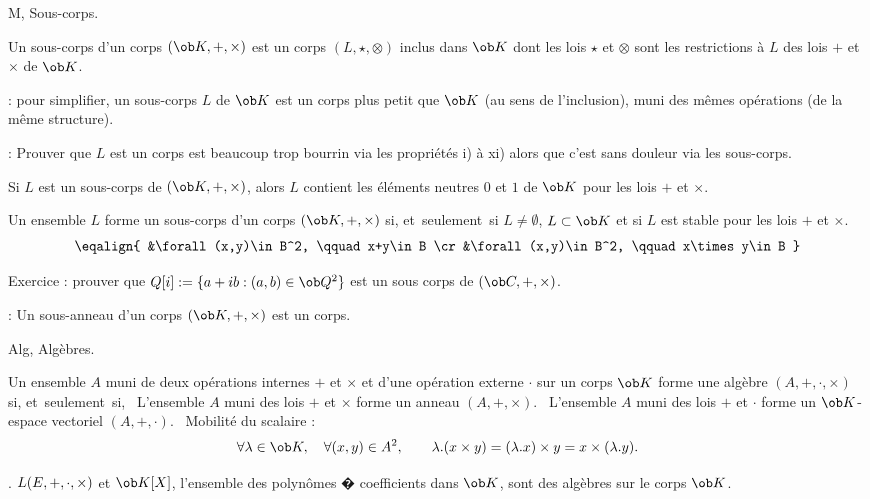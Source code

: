                                                                                                   
\Subsection M, Sous-corps. 


\Definition []  Un sous-corps d'un corps $(\ob K,+,\times)$ est un corps $(L, \star, \otimes)$ inclus dans $\ob K$ 
dont les lois $\star$ et $\otimes$ sont les restrictions \`a $L$ des lois $+$ et $\times$ de $\ob K$. 
\bigskip

\Remarque : pour simplifier, un sous-corps $L$ de $\ob K$ est un corps plus petit que $\ob K$ (au sens de l'inclusion), 
muni des m\^emes op\'erations (de la m\^eme structure). 
\bigskip

\Remarque : Prouver que $L$ est un corps est beaucoup trop bourrin via les propri\'et\'es i) \`a xi) alors que 
c'est sans douleur via les sous-corps. 
\bigskip

\Propriete []  Si $L$ est un sous-corps de $(\ob K,+,\times)$, alors $L$ contient les \'el\'ements neutres $0$ et $1$ de $\ob K$ 
pour les lois $+$ et $\times$. 
\bigskip

\Propriete []  Un ensemble $L$ forme un sous-corps d'un corps $(\ob K,+,\times)$ si, et~seulement~si
$L\neq\emptyset$, $L\subset \ob K$ et si $L$ est stable pour les lois $+$ et $\times$. 
$$
\eqalign{
	&\forall (x,y)\in B^2, \qquad x+y\in B
	\cr
	&\forall (x,y)\in B^2, \qquad x\times y\in B
}
$$

 
Exercice :  prouver que $Q[i]:=\{a+ib:(a,b)\in\ob Q^2\}$ est un sous corps de $(\ob C,+,\times)$. 
\bigskip

\Remarque : Un sous-anneau d'un corps $(\ob K, +,\times)$ est un corps. 
\bigskip

\Section Alg, Alg\`ebres.
\bigskip

       
\Definition [] Un ensemble $A$ muni de deux op\'erations internes $+$ et $\times$ et d'une op\'eration externe $\cdot$ 
sur un corps $\ob K$ forme une alg\`ebre $(A,+,\cdot,\times)$ si, et~seulement~si, 
\medskip
\noindent\qquad{}\ L'ensemble $A$ muni des lois $+$ et $\times$ forme un anneau $(A,+,\times)$.
\medskip
\noindent\qquad{}\ L'ensemble $A$ muni des lois $+$ et $\cdot$ forme un $\ob K$-espace vectoriel $(A,+,\cdot)$. 
\medskip
\noindent\qquad{}\ Mobilit\'e du scalaire : 
$$
\forall \lambda\in\ob K, \quad\forall (x,y)\in A^2,\qquad \lambda.(x\times y)=(\lambda.x)\times y=x\times(\lambda.y).
$$


\Exemple. $\sc L(E,+,\cdot,\times)$ et $\ob K[X]$, l'ensemble des polyn\^omes � coefficients dans $\ob K$, 
sont des alg\`ebres sur le corps $\ob K$. 
\bigskip

